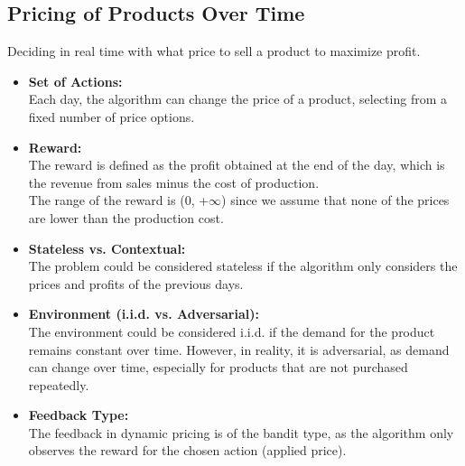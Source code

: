 \subsection{Pricing of Products Over Time}
Deciding in real time with what price to sell a product to maximize profit.

\begin{itemize}
\item \textbf{Set of Actions:} \\
Each day, the algorithm can change the price of a product, selecting from a fixed number of price options.

\item \textbf{Reward:} \\
The reward is defined as the profit obtained at the end of the day, which is the revenue from sales minus the cost of production. \\
The range of the reward is (0, +$\infty$) since we assume that none of the prices are lower than the production cost.

\item \textbf{Stateless vs. Contextual:} \\
The problem could be considered stateless if the algorithm only considers the prices and profits of the previous days.

\item \textbf{Environment (i.i.d. vs. Adversarial):} \\
The environment could be considered i.i.d. if the demand for the product remains constant over time.
However, in reality, it is adversarial, as demand can change over time, especially for products that are not purchased repeatedly.

\item \textbf{Feedback Type:} \\
The feedback in dynamic pricing is of the bandit type, as the algorithm only observes the reward for the chosen action (applied price).
\end{itemize}
